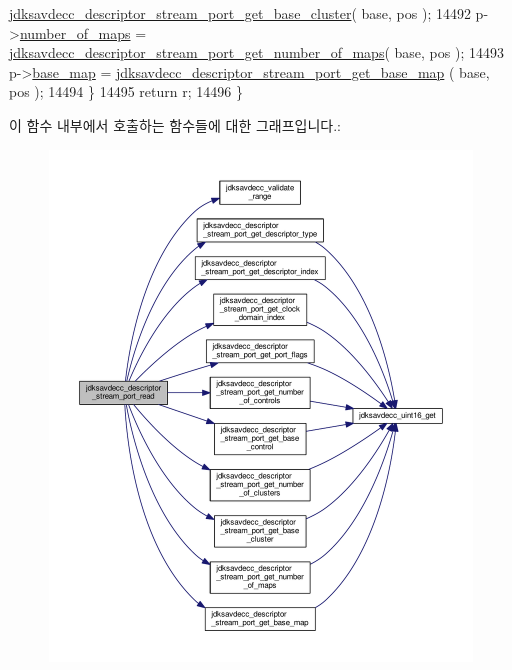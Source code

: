 \begin{DoxyCode}
      \hyperlink{group__descriptor__stream__port_ga94d4d5b718a920fa018d2b0070fe5208}{jdksavdecc\_descriptor\_stream\_port\_get\_base\_cluster}( base,
       pos );
14492         p->\hyperlink{structjdksavdecc__descriptor__stream__port_a6d00316ed943197ab46c0af22c1d430a}{number\_of\_maps} = 
      \hyperlink{group__descriptor__stream__port_gaf9d286bd9ce8e7bcd8e0fc37d7a776ad}{jdksavdecc\_descriptor\_stream\_port\_get\_number\_of\_maps}( 
      base, pos );
14493         p->\hyperlink{structjdksavdecc__descriptor__stream__port_ad71332cc282a2f8d6de8b12f56d8de28}{base\_map} = \hyperlink{group__descriptor__stream__port_gacd1e6804280845a853725f6e38639380}{jdksavdecc\_descriptor\_stream\_port\_get\_base\_map}
      ( base, pos );
14494     \}
14495     \textcolor{keywordflow}{return} r;
14496 \}
\end{DoxyCode}


이 함수 내부에서 호출하는 함수들에 대한 그래프입니다.\+:
\nopagebreak
\begin{figure}[H]
\begin{center}
\leavevmode
\includegraphics[width=350pt]{group__descriptor__stream__port_gadd062af797579a2aab567969f19b35d9_cgraph}
\end{center}
\end{figure}


